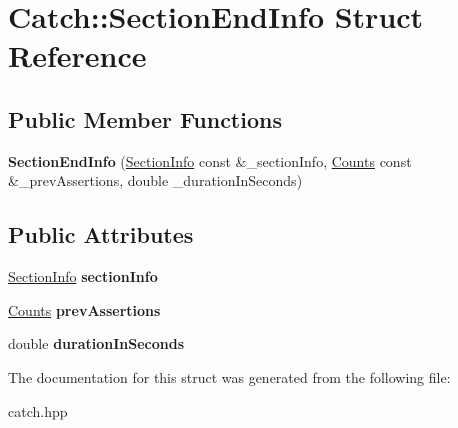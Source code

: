 \hypertarget{structCatch_1_1SectionEndInfo}{}\section{Catch\+:\+:Section\+End\+Info Struct Reference}
\label{structCatch_1_1SectionEndInfo}
\subsection*{Public Member Functions}
\begin{DoxyCompactItemize}
\item 
\mbox{\label{structCatch_1_1SectionEndInfo_abc9381c7c22b6907317ec985ccaa6713}} 
{\bfseries Section\+End\+Info} (\hyperlink{structCatch_1_1SectionInfo}{Section\+Info} const \&\+\_\+section\+Info, \hyperlink{structCatch_1_1Counts}{Counts} const \&\+\_\+prev\+Assertions, double \+\_\+duration\+In\+Seconds)
\end{DoxyCompactItemize}
\subsection*{Public Attributes}
\begin{DoxyCompactItemize}
\item 
\mbox{\label{structCatch_1_1SectionEndInfo_a2d44793392cb83735d086d726822abe9}} 
\hyperlink{structCatch_1_1SectionInfo}{Section\+Info} {\bfseries section\+Info}
\item 
\mbox{\label{structCatch_1_1SectionEndInfo_ae70b154cbc05b5dd2901d97f89303d8c}} 
\hyperlink{structCatch_1_1Counts}{Counts} {\bfseries prev\+Assertions}
\item 
\mbox{\label{structCatch_1_1SectionEndInfo_a7c262f2dab9cff166b8eca620c47eea5}} 
double {\bfseries duration\+In\+Seconds}
\end{DoxyCompactItemize}


The documentation for this struct was generated from the following file\+:\begin{DoxyCompactItemize}
\item 
catch.\+hpp\end{DoxyCompactItemize}
